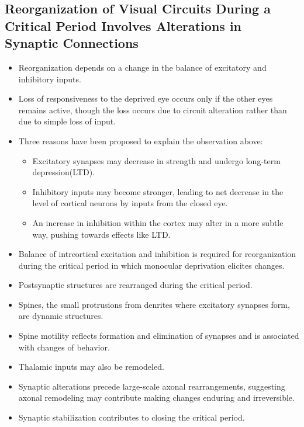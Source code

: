 \documentclass[12pt,a4paper]{article}
\begin{document}
\subsection{Reorganization of Visual Circuits During a Critical Period Involves Alterations in Synaptic Connections}
\begin{itemize}
    \item Reorganization depends on a change in the balance of excitatory and inhibitory inputs.
    \item Loss of responsiveness to the deprived eye occurs only if the other eyes remains active, though the loss occurs due to circuit alteration rather than due to simple loss of input.
    \item Three reasons have been proposed to explain the observation above:
        \begin{itemize}
            \item Excitatory synapses may decrease in strength and undergo long-term depression(LTD).
            \item Inhibitory inputs may become stronger, leading to net decrease in the level of cortical neurons by inputs from the closed eye.
            \item An increase in inhibition within the cortex may alter in a more subtle way, pushing towards effects like LTD.
        \end{itemize}
    \item Balance of intrcortical excitation and inhibition is required for reorganization during the critical period in which monocular deprivation elicites changes.
    \item Postsynaptic structures are rearranged during the critical period.
    \item Spines, the small protrusions from denrites where excitatory synapses form, are dynamic structures. 
    \item Spine motility reflects formation and elimination of synapses and is associated with changes of behavior.
    \item Thalamic inputs may also be remodeled.
    \item Synaptic alterations precede large-scale axonal rearrangements, suggesting axonal remodeling may contribute making changes enduring and irreversible.
    \item Synaptic stabilization contributes to closing the critical period.
\end{itemize}
\end{document}
